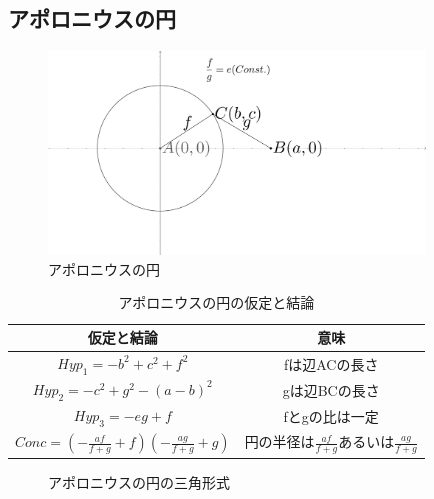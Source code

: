 \documentclass[dvipdfmx]{jsarticle}
\begin{document}
    \subsection{アポロニウスの円}
    \begin{figure}[H]
        \centering
        \includegraphics[width=10cm]{Appollonius.png}
        \caption{アポロニウスの円}
        \label{figure:Appollonius}
    \end{figure}
    \begin{table}[H]
        \caption{アポロニウスの円の仮定と結論}
        \centering
        \begin{tabular}{cc}
            仮定と結論 & 意味 \\
            \hline \hline
            $Hyp_{1} = - b^{2} + c^{2} + f^{2}$ & fは辺ACの長さ \\
            $Hyp_{2} = - c^{2} + g^{2} - \left(a - b\right)^{2}$ & gは辺BCの長さ \\
            $Hyp_{3} = - e g + f$ & fとgの比は一定 \\
            $Conc =\left(- \frac{a f}{f + g} + f\right) \left(- \frac{a g}{f + g} + g\right)$ & 円の半径は$\frac{a f}{f + g}$あるいは$\frac{a g}{f + g}$ \\
        \end{tabular}
    \end{table}
    \begin{figure}[H]
        \centering
        \caption{アポロニウスの円の三角形式}
    \end{figure}
\end{document}
